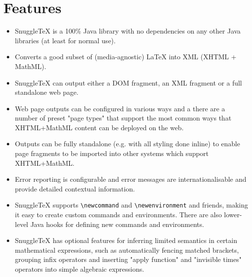 
\section*{Features}

\begin{itemize}

  \item SnuggleTeX is a 100\% Java library with no dependencies on any other Java libraries
        (at least for normal use).

  \item Converts a good subset of (media-agnostic) LaTeX into XML (XHTML + MathML).

  \item SnuggleTeX can output either a DOM fragment, an XML fragment or a full
        standalone web page.

  \item Web page outputs can be configured in various ways and a there are a
        number of preset "page types" that support the most common ways that XHTML+MathML
        content can be deployed on the web.

  \item Outputs can be fully standalone (e.g. with all styling done inline) to enable
        page fragments to be imported into other systems which support XHTML+MathML.

  \item Error reporting is configurable and error messages are internationalisable and
        provide detailed contextual information.

  \item SnuggleTeX supports \verb|\newcommand| and \verb|\newenvironment| and
        friends, making it easy to create custom commands and environments. There are
        also lower-level Java hooks for defining new commands and environments.

  \item SnuggleTeX has optional features for inferring limited semantics in
        certain mathematical expressions, such as automatically fencing matched
        brackets, grouping infix operators and inserting "apply function" and
        "invisible times" operators into simple algebraic expressions.

\end{itemize}
